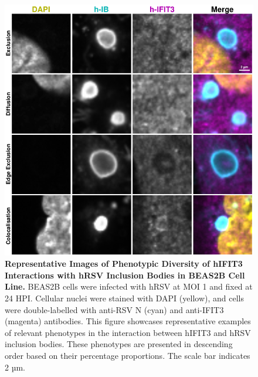 \begin{figure}
    \centering
    \includegraphics[width=1\linewidth]{08. Chapter 3/Figs/02. Infection/03. IFIT3/06. beas2b i3.pdf}
    \caption[Representative Images of Phenotypic Diversity of hIFIT3 Interactions with hRSV Inclusion Bodies in BEAS2B Cell Line]{\textbf{Representative Images of Phenotypic Diversity of hIFIT3 Interactions with hRSV Inclusion Bodies in BEAS2B Cell Line.} BEAS2B cells were infected with hRSV at MOI 1 and fixed at 24 HPI. Cellular nuclei were stained with DAPI (yellow), and cells were double-labelled with anti-RSV N (cyan) and anti-IFIT3 (magenta) antibodies. This figure showcases representative examples of relevant phenotypes in the interaction between hIFIT3 and hRSV inclusion bodies. These phenotypes are presented in descending order based on their percentage proportions. The scale bar indicates 2 µm.}
    \label{fig:Representative Images of Phenotypic Diversity of hIFIT3 Interactions with hRSV Inclusion Bodies in BEAS2B Cell Line}
\end{figure}

